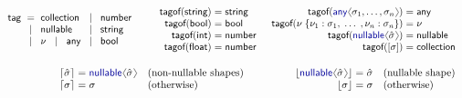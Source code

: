 \documentclass[10pt,preprint,blind,clearpagebib]{sigplanconf}
\newcommand{\langl}{\begin{picture}(4.5,7)
\put(1.1,2.5){\rotatebox{60}{\line(1,0){5.5}}}
\put(1.1,2.5){\rotatebox{300}{\line(1,0){5.5}}}
\end{picture}}
\newcommand{\rangl}{\begin{picture}(4.5,7)
\put(.9,2.5){\rotatebox{120}{\line(1,0){5.5}}}
\put(.9,2.5){\rotatebox{240}{\line(1,0){5.5}}}
\end{picture}}
\newcommand{\kvd}[1]{\textnormal{\textcolor{kvdclr}{\sffamily #1}}}
\newcommand{\ident}[1]{\textnormal{\sffamily #1}}
\newcommand{\lsep}[0]{\;\; | \;\;}
\newcommand{\narrow}[1]{\hspace{-0.7em} #1 \hspace{-0.7em}}
\newcommand{\tytag}{\ident{tag}}
\newcommand{\dropopt}[1]{\lfloor#1\rfloor}
\newcommand{\addopt}[1]{\lceil#1\rceil}
\newcommand{\tytagof}{\ident{tagof}}
\begin{document}

\begin{figure}[t]
\noindent
\begin{equation*}
\begin{array}{rclcl}
 \tytag &\narrow{=}& \ident{collection}  &\narrow{\lsep}& \ident{number} \\
        &\narrow{\lsep}& \ident{nullable} &\narrow{\lsep}& \ident{string}  \\
        &\narrow{\lsep}& \nu ~\lsep \ident{any} &\narrow{\lsep}& \ident{bool}
\end{array}
%
\quad\;\;\;
%
\begin{array}{rcl}
 \tytagof(\ident{string}) &\narrow{=}& \ident{string}\\
 \tytagof(\ident{bool}) &\narrow{=}& \ident{bool}\\
 \tytagof(\ident{int}) &\narrow{=}& \ident{number}\\
 \tytagof(\ident{float}) &\narrow{=}& \ident{number}\\
\end{array}
%
\;\;
%
\begin{array}{rcl}
 \tytagof(\kvd{any}\langl\sigma_1, \ldots, \sigma_n\rangl) &\narrow{=}& \ident{any}\\
 \tytagof(\nu\; \{ \nu_1 : \sigma_1, \; \ldots \; , \nu_n : \sigma_n \}) &\narrow{=}& \nu \\
 \tytagof(\kvd{nullable}\langl\hat{\sigma}\rangl) &\narrow{=}& \ident{nullable}\\
 \tytagof([\sigma]) &\narrow{=}& \ident{collection}\\
\end{array}
\end{equation*}

\vspace{-0.5em}
\begin{equation*}
\quad\qquad\qquad
\begin{array}{rcll}
 \addopt{\hat{\sigma}} &\narrow{=}& \kvd{nullable}\langl\hat{\sigma}\rangl &(\textnormal{non-nullable shapes})\\
 \addopt{\sigma} &\narrow{=}& \sigma &(\textnormal{otherwise})
\end{array}
\qquad\qquad
\begin{array}{rcll}
 \dropopt{\kvd{nullable}\langl\hat{\sigma}\rangl} &\narrow{=}& \hat{\sigma} &(\textnormal{nullable shape})\\
 \dropopt{\sigma} &\narrow{=}& \sigma &(\textnormal{otherwise})
\end{array}
\end{equation*}


\end{figure}
\end{document}
